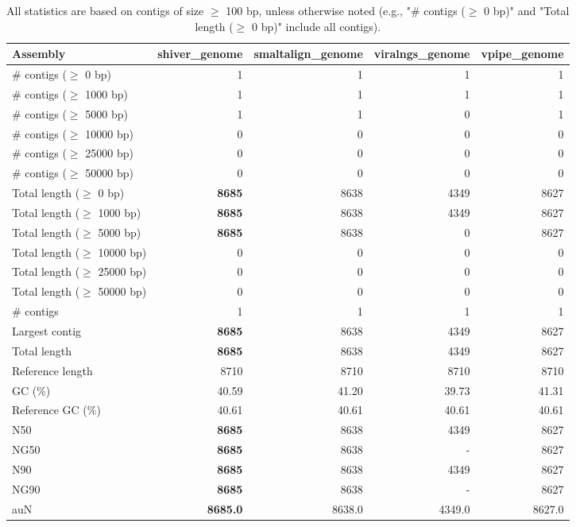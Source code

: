 \documentclass[12pt,a4paper]{article}
\begin{document}
\begin{table}[ht]
\begin{center}
\caption{All statistics are based on contigs of size $\geq$ 100 bp, unless otherwise noted (e.g., "\# contigs ($\geq$ 0 bp)" and "Total length ($\geq$ 0 bp)" include all contigs).}
\begin{tabular}{|l*{4}{|r}|}
\hline
Assembly & shiver\_genome & smaltalign\_genome & viralngs\_genome & vpipe\_genome \\ \hline
\# contigs ($\geq$ 0 bp) & 1 & 1 & 1 & 1 \\ \hline
\# contigs ($\geq$ 1000 bp) & 1 & 1 & 1 & 1 \\ \hline
\# contigs ($\geq$ 5000 bp) & 1 & 1 & 0 & 1 \\ \hline
\# contigs ($\geq$ 10000 bp) & 0 & 0 & 0 & 0 \\ \hline
\# contigs ($\geq$ 25000 bp) & 0 & 0 & 0 & 0 \\ \hline
\# contigs ($\geq$ 50000 bp) & 0 & 0 & 0 & 0 \\ \hline
Total length ($\geq$ 0 bp) & {\bf 8685} & 8638 & 4349 & 8627 \\ \hline
Total length ($\geq$ 1000 bp) & {\bf 8685} & 8638 & 4349 & 8627 \\ \hline
Total length ($\geq$ 5000 bp) & {\bf 8685} & 8638 & 0 & 8627 \\ \hline
Total length ($\geq$ 10000 bp) & 0 & 0 & 0 & 0 \\ \hline
Total length ($\geq$ 25000 bp) & 0 & 0 & 0 & 0 \\ \hline
Total length ($\geq$ 50000 bp) & 0 & 0 & 0 & 0 \\ \hline
\# contigs & 1 & 1 & 1 & 1 \\ \hline
Largest contig & {\bf 8685} & 8638 & 4349 & 8627 \\ \hline
Total length & {\bf 8685} & 8638 & 4349 & 8627 \\ \hline
Reference length & 8710 & 8710 & 8710 & 8710 \\ \hline
GC (\%) & 40.59 & 41.20 & 39.73 & 41.31 \\ \hline
Reference GC (\%) & 40.61 & 40.61 & 40.61 & 40.61 \\ \hline
N50 & {\bf 8685} & 8638 & 4349 & 8627 \\ \hline
NG50 & {\bf 8685} & 8638 & - & 8627 \\ \hline
N90 & {\bf 8685} & 8638 & 4349 & 8627 \\ \hline
NG90 & {\bf 8685} & 8638 & - & 8627 \\ \hline
auN & {\bf 8685.0} & 8638.0 & 4349.0 & 8627.0 \\ \hline

\end{tabular}
\end{center}
\end{table}
\end{document}

